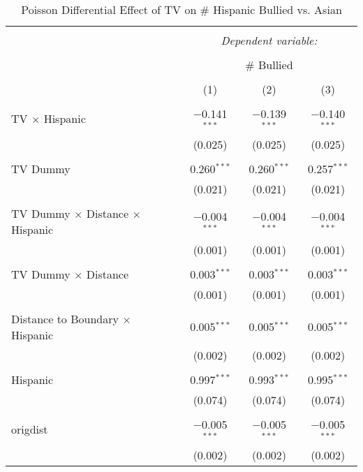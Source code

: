 
\begin{table}[!htbp] \centering 
  \caption{Poisson Differential Effect of TV on \# Hispanic Bullied vs. Asian} 
  \label{} 
\begin{tabular}{@{\extracolsep{-2pt}}lccc} 
\\[-1.8ex]\hline 
\hline \\[-1.8ex] 
 & \multicolumn{3}{c}{\textit{Dependent variable:}} \\ 
\cline{2-4} 
\\[-1.8ex] & \multicolumn{3}{c}{\# Bullied} \\ 
\\[-1.8ex] & (1) & (2) & (3)\\ 
\hline \\[-1.8ex] 
 TV $\times$ Hispanic & $-$0.141$^{***}$ & $-$0.139$^{***}$ & $-$0.140$^{***}$ \\ 
  & (0.025) & (0.025) & (0.025) \\ 
  & & & \\ 
 TV Dummy & 0.260$^{***}$ & 0.260$^{***}$ & 0.257$^{***}$ \\ 
  & (0.021) & (0.021) & (0.021) \\ 
  & & & \\ 
 TV Dummy $\times$ Distance $\times$ Hispanic & $-$0.004$^{***}$ & $-$0.004$^{***}$ & $-$0.004$^{***}$ \\ 
  & (0.001) & (0.001) & (0.001) \\ 
  & & & \\ 
 TV Dummy $\times$ Distance & 0.003$^{***}$ & 0.003$^{***}$ & 0.003$^{***}$ \\ 
  & (0.001) & (0.001) & (0.001) \\ 
  & & & \\ 
 Distance to Boundary $\times$ Hispanic & 0.005$^{***}$ & 0.005$^{***}$ & 0.005$^{***}$ \\ 
  & (0.002) & (0.002) & (0.002) \\ 
  & & & \\ 
 Hispanic & 0.997$^{***}$ & 0.993$^{***}$ & 0.995$^{***}$ \\ 
  & (0.074) & (0.074) & (0.074) \\ 
  & & & \\ 
 origdist & $-$0.005$^{***}$ & $-$0.005$^{***}$ & $-$0.005$^{***}$ \\ 
  & (0.002) & (0.002) & (0.002) \\ 

\end{tabular}
\end{table}

